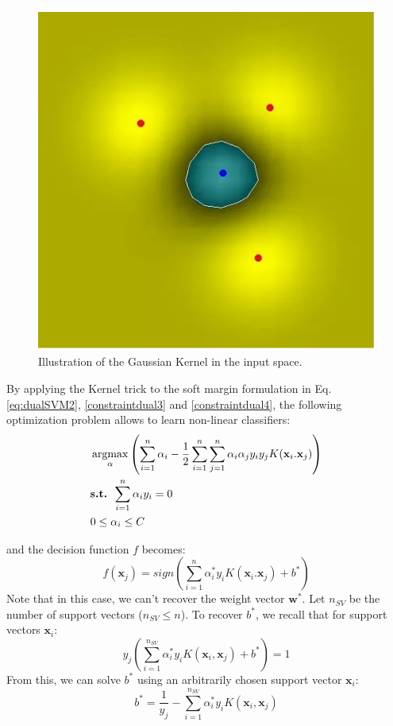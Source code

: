 \begin{figure}[h!]
\centering
\includegraphics[width=0.4\linewidth]{images/Kernel_Gaussian}
\caption{Illustration of the Gaussian Kernel in the input space.}
\label{fig:Kernel_Gaussian}
\end{figure}


By applying the Kernel trick to the soft margin formulation in Eq. \ref{eq:dualSVM2}, \ref{constraintdual3} and \ref{constraintdual4}, the following optimization problem allows to learn non-linear classifiers:
\begin{align}
	& \argmax_\alpha \left( 
	\sum\limits_{i=1}^{n} \alpha_i - \frac{1}{2} \sum\limits_{i=1}^{n} \sum\limits_{j=1}^{n} \alpha_i \alpha_j y_i y_j K(\textbf{x}_i . \textbf{x}_j) 
	\right) 
	\label{eq:dualSVM2kernel}\\
	& \textbf{s.t. } \sum\limits_{i=1}^{n}\alpha_i y_i = 0 \label{constraintdual3kernel}\\
	& 0 \leq \alpha_i \leq C  \label{constraintdual4kernel}
\end{align}

\noindent and the decision function $f$ becomes:
\begin{equation}
f(\textbf{x}_j) = sign(\sum\limits_{i=1}^{n} \alpha_i^*y_i K(\textbf{x}_i.\textbf{x}_j) + b^*) \label{decisionDualKernel}
\end{equation} 
\noindent Note that in this case, we can't recover the weight vector $\textbf{w}^*$.
Let $n_{SV}$ be the number of support vectors ($n_{SV} \leq n$). To recover $b^*$, we recall that for support vectors $\textbf{x}_i$:
\begin{equation}
	y_j \left( \sum\limits_{i=1}^{n_{SV}} \alpha_i^* y_i K(\textbf{x}_i,\textbf{x}_j) + b^* \right) = 1
\end{equation}
From this, we can solve $b^*$ using an arbitrarily chosen support vector $\textbf{x}_i$:
\begin{equation}
	b^* = \frac{1}{y_j} - \sum\limits_{i=1}^{n_{SV}} \alpha_i^* y_i K(\textbf{x}_i,\textbf{x}_j)
\end{equation}


